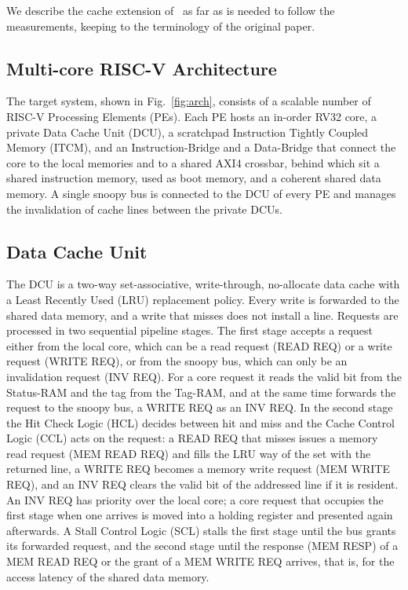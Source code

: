 \documentclass[conference]{IEEEtran}
\begin{document}
We describe the cache extension of~\cite{kamaleldin2024} as far as is needed
to follow the measurements, keeping to the terminology of the original paper.

\subsection{Multi-core RISC-V Architecture}

The target system, shown in Fig.~\ref{fig:arch}, consists of a scalable number
of RISC-V Processing Elements (PEs). Each PE hosts an in-order RV32 core, a
private Data Cache Unit (DCU), a scratchpad Instruction Tightly Coupled Memory
(ITCM), and an Instruction-Bridge and a Data-Bridge that connect the core to the
local memories and to a shared AXI4 crossbar, behind which sit a shared
instruction memory, used as boot memory, and a coherent shared data memory. A
single snoopy bus is connected to the DCU of every PE and manages the
invalidation of cache lines between the private DCUs.

\subsection{Data Cache Unit}

The DCU is a two-way set-associative, write-through, no-allocate data cache
with a Least Recently Used (LRU) replacement policy. Every write is forwarded
to the shared data memory, and a write that misses does not install a line.
Requests are processed in two sequential pipeline stages. The first stage
accepts a request either from the local core, which can be a read request
(READ REQ) or a write request (WRITE REQ), or from the snoopy bus, which can
only be an invalidation request (INV REQ). For a core request it reads the
valid bit from the Status-RAM and the tag from the Tag-RAM, and at the same
time forwards the request to the snoopy bus, a WRITE REQ as an INV REQ. In
the second stage the Hit Check Logic (HCL) decides between hit and miss and
the Cache Control Logic (CCL) acts on the request: a READ REQ that misses
issues a memory read request (MEM READ REQ) and fills the LRU way of the set
with the returned line, a WRITE REQ becomes a memory write request
(MEM WRITE REQ), and an INV REQ clears the valid bit of the addressed line if
it is resident. An INV REQ has priority over the local core; a core request
that occupies the first stage when one arrives is moved into a holding
register and presented again afterwards. A Stall Control Logic (SCL) stalls
the first stage until the bus grants its forwarded request, and the second
stage until the response (MEM RESP) of a MEM READ REQ or the grant of a
MEM WRITE REQ arrives, that is, for the access latency of the shared data
memory.
\end{document}

